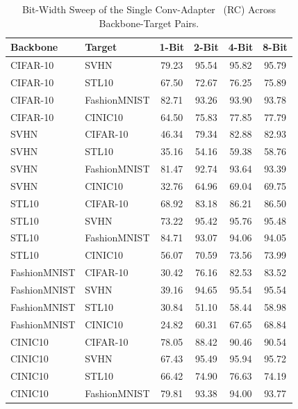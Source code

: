 \documentclass[12pt, a4paper]{report}
\numberwithin{equation}{chapter}
\numberwithin{figure}{chapter}
\numberwithin{table}{chapter}
\numberwithin{algorithm}{chapter}
\begin{document}
\begin{table}[H]
\centering
\caption{Bit-Width Sweep of the Single Conv-Adapter~\cite{Chen2024ConvAdapter} (RC) Across Backbone-Target Pairs.}
\label{tab:bitsweep_pairs}
\small
\begin{tabular}{llcccc}
\toprule
\textbf{Backbone} & \textbf{Target} & \textbf{1-Bit} & \textbf{2-Bit} & \textbf{4-Bit} & \textbf{8-Bit} \\
\midrule
CIFAR-10 & SVHN         & 79.23 & 95.54 & 95.82 & 95.79 \\
CIFAR-10 & STL10        & 67.50 & 72.67 & 76.25 & 75.89 \\
CIFAR-10 & FashionMNIST & 82.71 & 93.26 & 93.90 & 93.78 \\
CIFAR-10 & CINIC10      & 64.50 & 75.83 & 77.85 & 77.79 \\
\midrule
SVHN & CIFAR-10     & 46.34 & 79.34 & 82.88 & 82.93 \\
SVHN & STL10        & 35.16 & 54.16 & 59.38 & 58.76 \\
SVHN & FashionMNIST & 81.47 & 92.74 & 93.64 & 93.39 \\
SVHN & CINIC10      & 32.76 & 64.96 & 69.04 & 69.75 \\
\midrule
STL10 & CIFAR-10     & 68.92 & 83.18 & 86.21 & 86.50 \\
STL10 & SVHN         & 73.22 & 95.42 & 95.76 & 95.48 \\
STL10 & FashionMNIST & 84.71 & 93.07 & 94.06 & 94.05 \\
STL10 & CINIC10      & 56.07 & 70.59 & 73.56 & 73.99 \\
\midrule
FashionMNIST & CIFAR-10 & 30.42 & 76.16 & 82.53 & 83.52 \\
FashionMNIST & SVHN     & 39.16 & 94.65 & 95.54 & 95.54 \\
FashionMNIST & STL10    & 30.84 & 51.10 & 58.44 & 58.98 \\
FashionMNIST & CINIC10 & 24.82 & 60.31 & 67.65 & 68.84 \\
\midrule
CINIC10 & CIFAR-10     & 78.05 & 88.42 & 90.46 & 90.54 \\
CINIC10 & SVHN         & 67.43 & 95.49 & 95.94 & 95.72 \\
CINIC10 & STL10        & 66.42 & 74.90 & 76.63 & 74.19 \\
CINIC10 & FashionMNIST & 79.81 & 93.38 & 94.00 & 93.77 \\
\bottomrule
\end{tabular}
\end{table}
\end{document}
